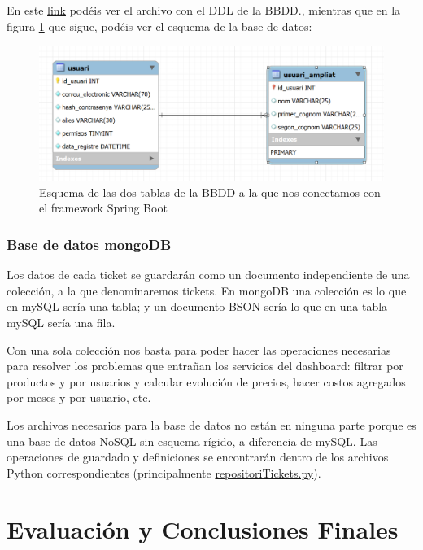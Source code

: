 \documentclass[a4paper,12pt]{report}
\begin{document}
	En este \href{https://github.com/blackcub3s/mercApp/blob/main/APP%20WEB/___BBDD___/estructuraTaules/mercApp.sql}{link} podéis ver el archivo con el DDL de la BBDD., mientras que en la figura \ref{fig:esquemaworkbench} que sigue, podéis ver el esquema de la base de datos: 
	\FloatBarrier
	\begin{figure}[H]
		\centering
		\includegraphics[width=1\linewidth]{img/esquemaWorkbench}
		\caption{Esquema de las dos tablas de la BBDD a la que nos conectamos con el framework Spring Boot}
		\label{fig:esquemaworkbench}
	\end{figure}
	\FloatBarrier
	
	
	\subsection{Base de datos mongoDB}
	
	Los datos de cada ticket se guardarán como un documento independiente de una colección, a la que denominaremos tickets. En mongoDB una colección es lo que en mySQL sería una tabla; y un documento BSON sería lo que en una tabla mySQL sería una fila.
	
	Con una sola colección nos basta para poder hacer las operaciones necesarias para resolver los problemas que entrañan los servicios del dashboard: filtrar por productos y por usuarios y calcular evolución de precios, hacer costos agregados por meses y por usuario, etc.
	
	Los archivos necesarios para la base de datos no están en ninguna parte porque es una base de datos NoSQL sin esquema rígido, a diferencia de mySQL. Las operaciones de guardado y definiciones se encontrarán dentro de los archivos Python correspondientes (principalmente \href{https://github.com/blackcub3s/mercApp/blob/main/APP%20WEB/__FastAPI__/app/repositoriTickets.py}{repositoriTickets.py}).
	
	\chapter{Evaluación y Conclusiones Finales} %
	
\end{document}
